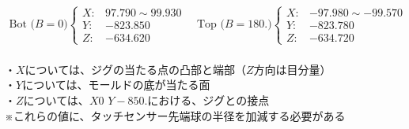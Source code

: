 \clearpage
~\vfill
\begin{tcolorbox}[title={2023/07/28時点の\MMname 実測値}, fonttitle=\gtfamily\bfseries]
\begin{align*}
  \text{Bot ($B=0$)}
  \left\{
  \begin{array}{rl}
    X: & 97.790 \sim 99.930\\
    Y: & -823.850\\
    Z: & -634.620
  \end{array}
  \right.\quad
  \text{Top ($B=180.$)}
  \left\{
  \begin{array}{rl}
    X: & -97.980 \sim -99.570\\
    Y: & -823.780\\
    Z: & -634.720
  \end{array}
  \right.
\end{align*}\\
・$X$については、ジグの当たる点の凸部と端部（$Z$方向は目分量）\\
・$Y$については、モールドの底が当たる面\\
・$Z$については、$X0$ $Y-850.$における、ジグとの接点\\
※これらの値に、タッチセンサー先端球の半径を加減する必要がある
\end{tcolorbox}
